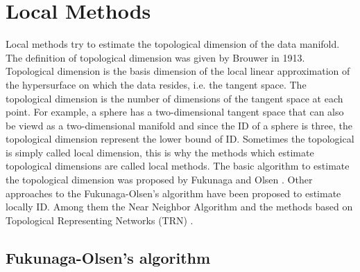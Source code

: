 \documentclass[journal]{IEEEtran}
\begin{document}







\section{Local Methods}
Local methods try to estimate the topological dimension of the
data manifold. The definition of topological dimension was given by Brouwer
\cite{Brouwer75} in 1913. Topological dimension is the basis dimension of the local linear
approximation of the hypersurface on which the data resides, i.e. the tangent
space. The topological dimension is the number of dimensions of the tangent space at each point.
For example, a sphere has a two-dimensional tangent space that can also be viewd as a two-dimensional manifold
 and since the ID of a sphere is three, the topological dimension represent the lower bound of ID. 
Sometimes the topological is simply called local dimension, this is why the methods which estimate topological dimensions are 
called local methods. 
The basic algorithm to estimate the topological 
dimension was proposed by Fukunaga and Olsen \cite{Fukunaga76}. Other approaches 
to the Fukunaga-Olsen’s algorithm have been proposed to estimate locally 
ID. Among them the Near Neighbor Algorithm \cite{Pettis79} and the methods based on 
Topological Representing Networks (TRN) \cite{Martinetz94}.

\subsection{Fukunaga-Olsen’s algorithm}
\end{document}
